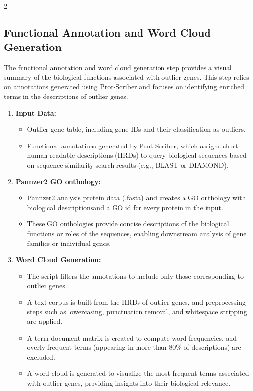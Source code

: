 2\documentclass{article}
\begin{document}
\subsection{Functional Annotation and Word Cloud Generation}
The functional annotation and word cloud generation step provides a visual summary of the biological functions associated with outlier genes. This step relies on annotations generated using Prot-Scriber and focuses on identifying enriched terms in the descriptions of outlier genes.

\begin{enumerate}
    \item \textbf{Input Data:}
    \begin{itemize}
        \item Outlier gene table, including gene IDs and their classification as outliers.
        \item Functional annotations generated by Prot-Scriber, which assigns short human-readable descriptions (HRDs) to query biological sequences based on sequence similarity search results (e.g., BLAST or DIAMOND).
    \end{itemize}

    \item \textbf{Pannzer2 GO onthology:}
    \begin{itemize}
        \item Pannzer2 analysis protein data (.fasta) and creates a GO onthology with biological descriptionsand a GO id for every protein in the input.
        \item These GO onthologies provide concise descriptions of the biological functions or roles of the sequences, enabling downstream analysis of gene families or individual genes.
    \end{itemize}

    \item \textbf{Word Cloud Generation:}
    \begin{itemize}
        \item The script filters the annotations to include only those corresponding to outlier genes.
        \item A text corpus is built from the HRDs of outlier genes, and preprocessing steps such as lowercasing, punctuation removal, and whitespace stripping are applied.
        \item A term-document matrix is created to compute word frequencies, and overly frequent terms (appearing in more than 80\% of descriptions) are excluded.
        \item A word cloud is generated to visualize the most frequent terms associated with outlier genes, providing insights into their biological relevance.
    \end{itemize}


\end{enumerate}
\end{document}
